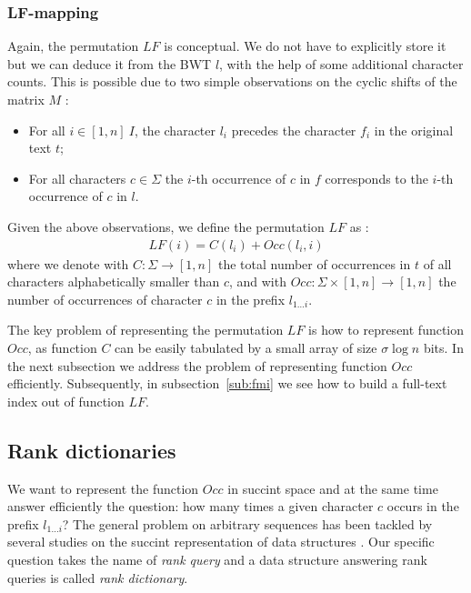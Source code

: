 \subsubsection{LF-mapping}

Again, the permutation $LF$ is conceptual. We do not have to explicitly store it but we can deduce it from the BWT $l$, with the help of some additional character counts.
This is possible due to two simple observations on the cyclic shifts of the matrix $M$ \citep{Burrows1994}:
\begin{itemize}
\item For all $i \in [1,n] \ I$, the character $l_i$ precedes the character $f_i$ in the original text $t$;
\item For all characters $c \in \Sigma$ the $i$-th occurrence of $c$ in $f$ corresponds to the $i$-th occurrence of $c$ in $l$.
\end{itemize}
Given the above observations, we define the permutation $LF$ as \citep{Burrows1994,Ferragina2000}:
\begin{eqnarray}
LF(i) = C(l_i) + Occ(l_i, i)
\end{eqnarray}
where we denote with $C : \Sigma \rightarrow [1,n]$ the total number of occurrences in $t$ of all characters alphabetically smaller than $c$, and with $Occ :  \Sigma \times [1,n] \rightarrow [1,n]$ the number of occurrences of character $c$ in the prefix $l_{1 \dots i}$.

The key problem of representing the permutation $LF$ is how to represent function $Occ$, as function $C$ can be easily tabulated by a small array of size $\sigma \log{n}$ bits.
In the next subsection we address the problem of representing function $Occ$ efficiently. Subsequently, in subsection~\ref{sub:fmi} we see how to build a full-text index out of function $LF$.

\subsection{Rank dictionaries}

We want to represent the function $Occ$ in succint space and at the same time answer efficiently the question: how many times a given character $c$ occurs in the prefix $l_{1 \dots i}$?
The general problem on arbitrary sequences has been tackled by several studies on the succint representation of data structures \citep{Jacobson1989}.
Our specific question takes the name of \emph{rank query} and a data structure answering rank queries is called \emph{rank dictionary}.

